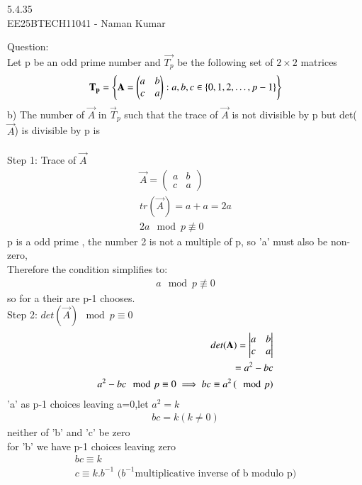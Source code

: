 \documentclass[journal]{IEEEtran}
\author{EE25BTECH11041-Naman Kumar }
\begin{document}
\begin{center}
    \huge{5.4.35}\\
    \large{EE25BTECH11041 - Naman Kumar}
\end{center}
Question:\\
Let p be an odd prime number and $\vec{T_p}$ be the following set of $2\times2$ matrices
\begin{align}
\vec{T_p}=\cbrak{\Vec{A}=\begin{pmatrix}a&b\\c&a\end{pmatrix}:a,b,c \in \cbrak{0,1,2,\dots,p-1} }
\end{align}
b) The number of $\vec{A}$ in $\vec{T}_p$ such that the trace of $\vec{A}$ is not divisible by p but det($\vec{A}$) is divisible by p is\\
\solution \\
Step 1: Trace of $\vec{A}$
\begin{align}
    \vec{A}=\begin{pmatrix}a&b\\c&a \end{pmatrix}\\
    tr(\vec{A})=a+a=2a\\
    2a \mod p \not\equiv  0
\end{align}
p is a odd prime , the number 2 is not a multiple of p, so 'a' must also be non-zero,\\
Therefore the condition simplifies to:
\begin{align}
    a\mod p \not\equiv 0
\end{align}
so for a their are p-1 chooses.\\
Step 2: $det(\vec{A})\mod p\equiv0$
\begin{align}
    det(\mathbf{A})=\begin{vmatrix}a&b\\c&a \end{vmatrix}\\
    =a^2-bc\\
    a^2-bc\mod p \equiv 0 \implies bc\equiv a^2 \left(\mod p\right)
\end{align}
'a' as p-1 choices leaving a=0,let $a^2=k$
\begin{align}
    bc=k(k\neq0)
\end{align}
neither of  'b' and 'c' be zero\\
for 'b' we have p-1 choices leaving zero
\begin{align}
    bc\equiv k\\
    c \equiv k.b^{-1}\text{ ($b^{-1}$multiplicative inverse of b modulo p)}
\end{align}
\end{document}
